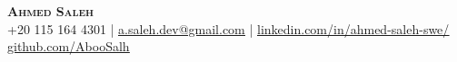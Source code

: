\begin{center}
    \textbf{\Huge \scshape Ahmed Saleh} \\ \vspace{1pt}
    +20 115 164 4301 \quad | \quad
    \href{mailto:a.saleh.dev@gmail.com}{\underline{a.saleh.dev@gmail.com}} \quad | \quad
    \href{https://www.linkedin.com/in/ahmed-saleh-swe/}{\underline{linkedin.com/in/ahmed-saleh-swe/}} \\ \vspace{1pt}
    \href{https://github.com/AbooSalh}{\underline{github.com/AbooSalh}}
\end{center}